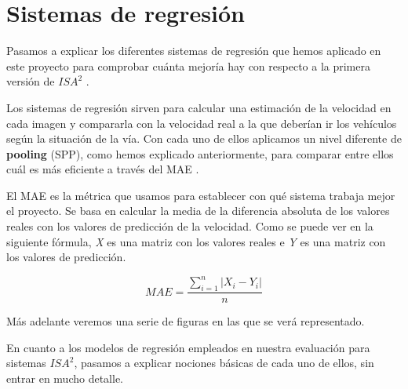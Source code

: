 

\section{Sistemas de regresión}

Pasamos a explicar los diferentes sistemas de regresión que hemos aplicado en este proyecto para comprobar cuánta mejoría hay con respecto a la primera versión de $ISA^{2}$ \cite{isa2}.

Los sistemas de regresión sirven para calcular una estimación de la velocidad en cada imagen y compararla con la velocidad real a la que deberían ir los vehículos según la situación de la vía. Con cada uno de ellos aplicamos un nivel diferente de \textbf{pooling} (\ac{SPP}), como hemos explicado anteriormente, para comparar entre ellos cuál es más eficiente a través del \ac{MAE} \cite{mae}.
 
El \ac{MAE} es la métrica que usamos para establecer con qué sistema trabaja mejor el proyecto. Se basa en calcular la media de la diferencia absoluta de los valores reales con los valores de predicción de la velocidad. Como se puede ver en la siguiente fórmula, \textit{X} es una matriz con los valores reales e \textit{Y} es una matriz con los valores de predicción.

\begin{equation}\label{eq:MAE}
MAE = \frac{\sum_{i=1}^{n}|X_i - Y_i|}{n}
\end{equation}

Más adelante veremos una serie de figuras en las que se verá representado.


En cuanto a los modelos de regresión empleados en nuestra evaluación para sistemas $ISA^2$, pasamos a explicar nociones básicas de cada uno de ellos, sin entrar en mucho detalle.
